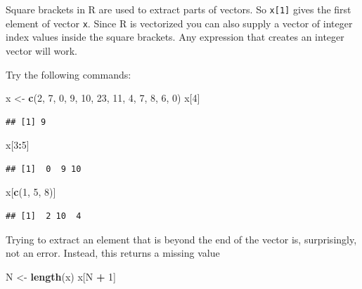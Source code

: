 \documentclass[
]{book}
\newenvironment{Shaded}{\begin{snugshade}}{\end{snugshade}}
\newcommand{\DecValTok}[1]{\textcolor[rgb]{0.00,0.00,0.81}{#1}}
\newcommand{\FunctionTok}[1]{\textcolor[rgb]{0.13,0.29,0.53}{\textbf{#1}}}
\newcommand{\NormalTok}[1]{#1}
\newcommand{\OtherTok}[1]{\textcolor[rgb]{0.56,0.35,0.01}{#1}}
\newcommand{\SpecialCharTok}[1]{\textcolor[rgb]{0.81,0.36,0.00}{\textbf{#1}}}
\theoremstyle{definition}
\theoremstyle{definition}
\theoremstyle{definition}
\theoremstyle{definition}
\theoremstyle{remark}
\begin{document}
Square brackets in R are used to extract parts of vectors. So
\texttt{x{[}1{]}} gives the first element of vector \texttt{x}. Since R is
vectorized you can also supply a vector of integer index values inside
the square brackets. Any expression that creates an integer vector
will work.

Try the following commands:

\begin{Shaded}
\begin{Highlighting}[]
\NormalTok{x }\OtherTok{\textless{}{-}} \FunctionTok{c}\NormalTok{(}\DecValTok{2}\NormalTok{, }\DecValTok{7}\NormalTok{, }\DecValTok{0}\NormalTok{, }\DecValTok{9}\NormalTok{, }\DecValTok{10}\NormalTok{, }\DecValTok{23}\NormalTok{, }\DecValTok{11}\NormalTok{, }\DecValTok{4}\NormalTok{, }\DecValTok{7}\NormalTok{, }\DecValTok{8}\NormalTok{, }\DecValTok{6}\NormalTok{, }\DecValTok{0}\NormalTok{)}
\NormalTok{x[}\DecValTok{4}\NormalTok{]}
\end{Highlighting}
\end{Shaded}

\begin{verbatim}
## [1] 9
\end{verbatim}

\begin{Shaded}
\begin{Highlighting}[]
\NormalTok{x[}\DecValTok{3}\SpecialCharTok{:}\DecValTok{5}\NormalTok{]}
\end{Highlighting}
\end{Shaded}

\begin{verbatim}
## [1]  0  9 10
\end{verbatim}

\begin{Shaded}
\begin{Highlighting}[]
\NormalTok{x[}\FunctionTok{c}\NormalTok{(}\DecValTok{1}\NormalTok{, }\DecValTok{5}\NormalTok{, }\DecValTok{8}\NormalTok{)]}
\end{Highlighting}
\end{Shaded}

\begin{verbatim}
## [1]  2 10  4
\end{verbatim}

Trying to extract an element that is beyond the end of the vector is,
surprisingly, not an error. Instead, this returns a missing value

\begin{Shaded}
\begin{Highlighting}[]
\NormalTok{N }\OtherTok{\textless{}{-}} \FunctionTok{length}\NormalTok{(x)}
\NormalTok{x[N }\SpecialCharTok{+} \DecValTok{1}\NormalTok{]}
\end{Highlighting}
\end{Shaded}
\end{document}
